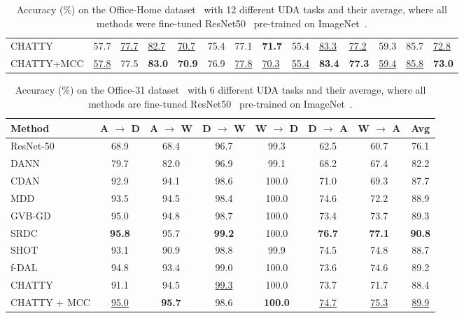 \documentclass[10pt,twocolumn,letterpaper]{article}
\begin{document}
\begin{table*}
\begin{center}
\begin{tabular}{|l|p{0.7cm}|p{0.7cm}|p{0.7cm}|p{0.7cm}|p{0.7cm}|p{0.7cm}|p{0.7cm}|p{0.7cm}|p{0.7cm}|p{0.7cm}|p{0.7cm}|p{0.7cm}|p{0.5cm}|}
\hline
CHATTY	&	57.7	&	\underline{77.7} &	\underline{82.7} &	\underline{70.7} &	75.4	&	77.1	&	\textbf{71.7}	&	55.4	&	\underline{83.3} &	\underline{77.2} &	59.3	&	85.7	&	\underline{72.8} \\
CHATTY+MCC	&	\underline{57.8} &	77.5	&	\textbf{83.0}	&	\textbf{70.9}	&	76.9	&	\underline{77.8} &	\underline{70.3} &	\underline{55.4} &	\textbf{83.4}	&	\textbf{77.3}	&	\underline{59.4} &	\underline{85.8} &	\textbf{73.0}	\\
\hline
\end{tabular}
\end{center}
\caption{Accuracy (\%) on the Office-Home dataset~\cite{office-home} with 12 different UDA tasks and their average, where all methods were fine-tuned ResNet50~\cite{resnet} pre-trained on ImageNet~\cite{imagenet}.}
\label{table:office-home}
\end{table*}


\begin{table*}
\begin{center}
\begin{tabular}{|l|c|c|c|c|c|c|c|}
\hline
Method	&	A $\rightarrow$ D 	&	A $\rightarrow$ W	&	D $\rightarrow$ W	&	W $\rightarrow$ D	&	D $\rightarrow$ A	&	W $\rightarrow$ A	&	Avg \\
\hline
ResNet-50~\cite{resnet}	&	68.9	&	68.4	&	96.7	&	99.3	&	62.5	&	60.7	&	76.1 \\
DANN~\cite{dann}	&	79.7	&	82.0	&	96.9	&	99.1	&	68.2	&	67.4	&	82.2 \\
CDAN~\cite{cdan}	&	92.9	&	94.1	&	98.6	&	100.0	&	71.0	&	69.3	&	87.7 \\
MDD~\cite{mdd}	&	93.5	&	94.5	&	98.4	&	100.0	&	74.6	&	72.2	&	88.9 \\
GVB-GD~\cite{gvb}	&	95.0	&	94.8	&	98.7	&	100.0	&	73.4	&	73.7	&	89.3 \\
SRDC~\cite{srdc}	&	\textbf{95.8}	&	95.7	&	\textbf{99.2}	&	100.0	&	\textbf{76.7}	&	\textbf{77.1}	&	\textbf{90.8} \\
SHOT~\cite{shot}	&	93.1	&	90.9	&	98.8 &	99.9	&	74.5	&	74.8	&	88.7 \\
f-DAL~\cite{fdal}	&	94.8	&	93.4	&	99.0 &	100.0	&	73.6	&	74.6	&	89.2 \\
\hline
CHATTY	&	91.1	&	94.5	&	\underline{99.3} &	100.0	&	73.7	&	71.7	&	88.4 \\
CHATTY + MCC	&	\underline{95.0}	&	\textbf{95.7}	&	98.6	&	\textbf{100.0} &	\underline{74.7} &	\underline{75.3}&	\underline{89.9} \\
\hline
\end{tabular}
\end{center}
\caption{Accuracy (\%) on the Office-31 dataset~\cite{office31} with 6 different UDA tasks and their average, where all methods are fine-tuned ResNet50~\cite{resnet} pre-trained on ImageNet~\cite{imagenet}.}
\label{table:office-31}
\end{table*}
\end{document}
